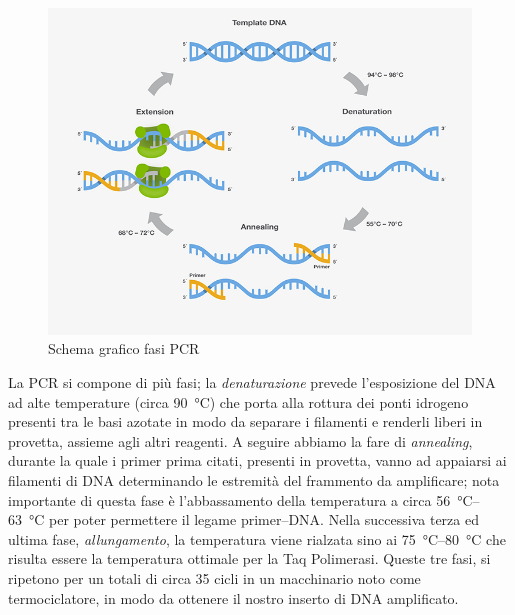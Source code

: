 \documentclass[twocolumn,a4paper,10pt]{my_report}
\begin{document}
\begin{figure}[htbp]
\centering
\includegraphics[width=0.8\linewidth]{1.jpg}
\caption{Schema grafico fasi PCR}
\label{fig:FasiPCR}
\end{figure}

La PCR si compone di più fasi; la \emph{denaturazione} prevede l’esposizione del DNA ad alte temperature (circa \SI{90}{\celsius}) che porta alla rottura dei ponti idrogeno presenti tra le basi azotate in modo da separare i filamenti e renderli liberi in provetta, assieme agli altri reagenti.
A seguire abbiamo la fare di \emph{annealing}, durante la quale i primer prima citati, presenti in provetta, vanno ad appaiarsi ai filamenti di DNA determinando le estremità del frammento da amplificare; nota importante di questa fase è l’abbassamento della temperatura a circa \SIrange{56}{63}{\celsius} per poter permettere il legame primer--DNA.
Nella successiva terza ed ultima fase, \emph{allungamento}, la temperatura viene rialzata sino ai \SIrange{75}{80}{\celsius} che risulta essere la temperatura ottimale per la Taq Polimerasi. Queste tre fasi, si ripetono per un totali di circa 35 cicli in un macchinario noto come termociclatore, in modo da ottenere il nostro inserto di DNA amplificato.
\end{document}
